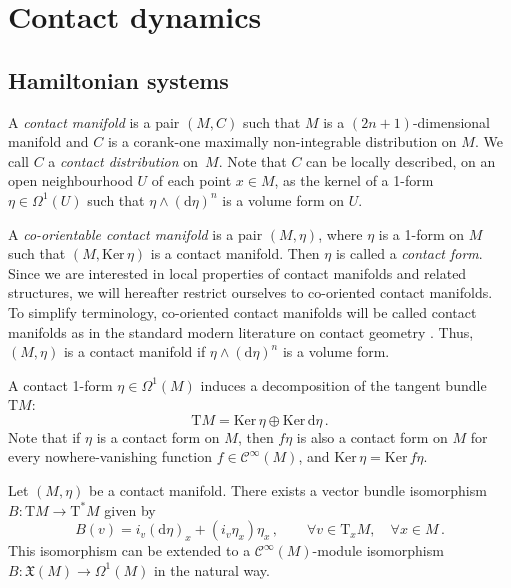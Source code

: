 \documentclass[11pt]{article}
\theoremstyle{plain}
\theoremstyle{definition}
\renewcommand{\d}{\mathrm{d}}
\newcommand{\Cinfty}{\mathscr{C}^\infty}
\newcommand{\T}{{\mathrm T}}
\newcommand{\cT}{\T^{\ast}}
\newcommand{\X}{\mathfrak{X}}
\def\d{\mathrm{d}}
\def\X{\mathfrak{X}}
\def\d{\mathrm{d}}
\def\Ker{\mathrm{Ker \,}}
\begin{document}
\section{Contact dynamics}\label{contact_mechanics}


\subsection{Hamiltonian systems}

A \textsl{contact manifold} is a pair $(M,C)$ such that $M$ is a $(2n+1)$-dimensional manifold and $C$ is a corank-one maximally non-integrable distribution on $M$. We call $C$ a \textsl{contact distribution} on~$M$. Note that $C$ can be locally described, on an open neighbourhood $U$ of each point $x\in M$, as the kernel of a 1-form $\eta\in\Omega^1(U)$ such that $\eta\wedge(\d\eta)^n$ is a volume form on $U$.

A {\sl co-orientable contact manifold} is a pair $(M,\eta)$, where $\eta$ is a 1-form on $M$ such that $(M,\Ker\eta)$ is a contact manifold. Then $\eta$ is called a {\sl  contact form}. Since we are interested in local properties of contact manifolds and related structures, we will hereafter restrict ourselves to co-oriented contact manifolds. To simplify terminology, co-oriented contact manifolds will be called contact manifolds as in the standard modern literature on contact geometry \cite{Bra_17,LL_19,GGMRR_20a}. Thus, $(M,\eta)$ is a contact manifold if $\eta\wedge(\d\eta)^n$ is a volume form.

A contact 1-form $\eta\in\Omega^1(M)$ induces a decomposition of the tangent bundle $\T M$:
$$ \T M = \Ker\eta\oplus\Ker\d\eta\,. $$
Note that if $\eta$ is a contact form on $M$, then $f\eta$ is also a contact form on $M$ for every nowhere-vanishing function $f\in\Cinfty(M)$, and $\Ker \eta = \Ker f\eta$. 

Let $(M,\eta)$ be a contact manifold. There exists a vector bundle isomorphism $B \colon \T M\to\cT M$ given by
\begin{equation}
\label{canis}
 B(v) = i_v(\d\eta)_x + (i_v\eta_x)\eta_x\,,\qquad \forall v\in \T_x M,\quad\forall x\in M\,.     
\end{equation}
This isomorphism can be extended to a $\Cinfty(M)$-module isomorphism $B \colon \X(M)\to\Omega^1(M)$ in the natural way.
\end{document}
